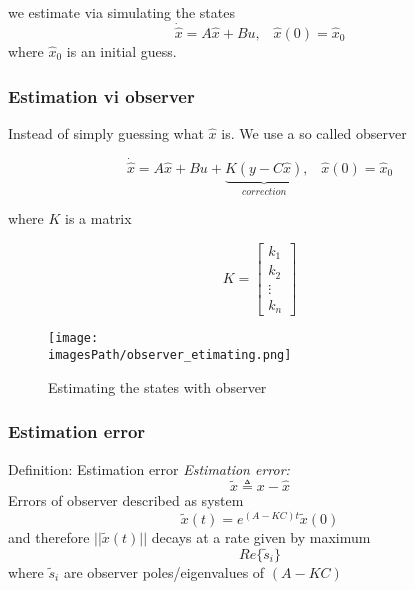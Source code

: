we estimate via simulating the states
\begin{equation*}
    \dot{\hat{x}} = A\hat{x} + Bu, \;\;\; \hat{x}(0) = \hat{x}_0
\end{equation*}
where $\hat{x}_0$ is an initial guess.

\subsubsection{Estimation vi observer}
Instead of simply guessing what $\hat{x}$ is. 
We use a so called observer

\begin{equation*}
    \dot{\hat{x}} = A\hat{x} + Bu + \underbrace{K(y-C\hat{x})}_{correction}, \;\;\; \hat{x}(0) = \hat{x}_0
\end{equation*}

where $K$ is a matrix

\begin{equation*}
    K = \begin{bmatrix} k_1 \\ k_2 \\ \vdots \\ k_n \end{bmatrix}
\end{equation*}

\begin{figure}[!h]
    \centering
    \texttt{[image: \\imagesPath/observer\_etimating.png]}
    \caption{Estimating the states with observer}
\end{figure}

\subsubsection{Estimation error}
\begin{definitionblock}{Definition: Estimation error}
    \textit{Estimation error:}
    \begin{equation*}
        \tilde{x} \triangleq x-\hat{x}
    \end{equation*}
    Errors of observer described as system 
    \begin{equation*}
        \tilde{x}(t) = e^{(A-KC)t}\tilde{x}(0)
    \end{equation*}
    and therefore $||\tilde{x}(t)||$ decays at a rate given by maximum
    \begin{equation*}
        Re\{\tilde{s}_i\}
    \end{equation*}
    where $\tilde{s}_i$ are observer poles/eigenvalues of $(A-KC)$ 
\end{definitionblock}

